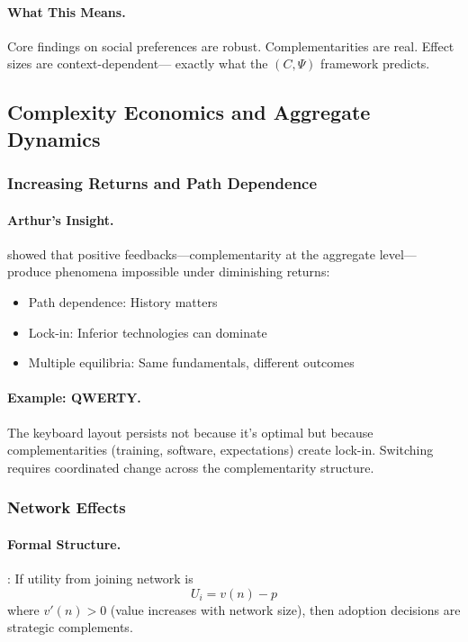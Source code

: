 \documentclass[12pt,a4paper]{article}
\begin{document}
\paragraph{What This Means.}
Core findings on social preferences are robust.
Complementarities are real. Effect sizes are context-dependent---
exactly what the $(C, \Psi)$ framework predicts.

\subsection{Complexity Economics and Aggregate Dynamics}

\subsubsection{Increasing Returns and Path Dependence}

\paragraph{Arthur's Insight.}
\citet{arthur1989} showed that positive feedbacks---complementarity at the aggregate level---
produce phenomena impossible under diminishing returns:
\begin{itemize}
  \item Path dependence: History matters
  \item Lock-in: Inferior technologies can dominate
  \item Multiple equilibria: Same fundamentals, different outcomes
\end{itemize}

\paragraph{Example: QWERTY.}
The keyboard layout persists not because it's optimal
but because complementarities (training, software, expectations) create lock-in.
Switching requires coordinated change across the complementarity structure.

\subsubsection{Network Effects}

\paragraph{Formal Structure.}
\citet{katzshapiro1985}: If utility from joining network is
\begin{equation}
  U_i = v(n) - p
\end{equation}
where $v'(n) > 0$ (value increases with network size),
then adoption decisions are strategic complements.
\end{document}

